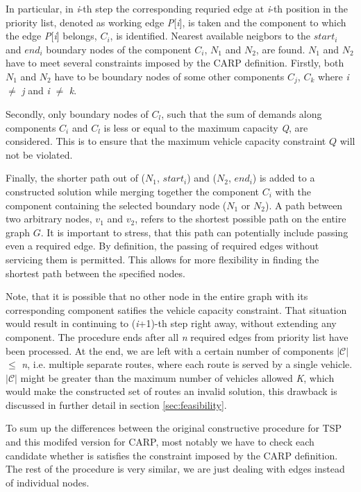 \documentclass[twoside]{ctuthesis}
\theoremstyle{plain}
\theoremstyle{definition}
\theoremstyle{note}
\begin{document}
In particular, in \emph{i}-th step the corresponding requried edge at \emph{i}-th position in the priority list, denoted as working edge \emph{P}[\emph{i}], is taken and the component to which the edge \emph{P}[\emph{i}] belongs, \emph{$C_i$}, is identified. Nearest available neigbors to the \emph{$start_i$} and \emph{$end_i$} boundary nodes of the component \emph{$C_i$}, \emph{$N_1$} and \emph{$N_2$}, are found. \emph{$N_1$} and \emph{$N_2$} have to meet several constraints imposed by the CARP definition. Firstly, both \emph{$N_1$} and \emph{$N_2$} have to be boundary nodes of some other components \emph{$C_j$}, \emph{$C_k$} where \emph{i} $\neq$ \emph{j} and \emph{i} $\neq$ \emph{k}. 

Secondly, only boundary nodes of \emph{$C_l$}, such that the sum of demands along components \emph{$C_i$} and \emph{$C_l$} is less or equal to the maximum capacity \emph{Q}, are considered. This is to ensure that the maximum vehicle capacity constraint $Q$ will not be violated.

Finally, the shorter path out of (\emph{$N_1$}, \emph{$start_i$}) and (\emph{$N_2$}, \emph{$end_i$}) is added to a constructed solution while merging together the component \emph{$C_i$} with the component containing the selected boundary node (\emph{$N_1$} or \emph{$N_2$}).
A path between two arbitrary nodes, $v_1$ and $v_2$, refers to the shortest possible path on the entire graph $G$. It is important to stress, that this path can potentially include passing even a required edge. By definition, the passing of required edges without servicing them is permitted. This allows for more flexibility in finding the shortest path between the specified nodes.

Note, that it is possible that no other node in the entire graph with its corresponding component satifies the vehicle capacity constraint. That situation would result in continuing to (\emph{i}+1)-th step right away, without extending any component. The procedure ends after all \emph{n} required edges from priority list have been processed. At the end, we are left with a certain number of components \emph{$\mathcal{|C|}$} $\leq$ \emph{n}, i.e. multiple separate routes, where each route is served by a single vehicle. \emph{$\mathcal{|C|}$} might be greater than the maximum number of vehicles allowed \emph{K}, which would make the constructed set of routes an invalid solution, this drawback is discussed in further detail in section \ref{sec:feasibility}.

To sum up the differences between the original constructive procedure for TSP and this modifed version for CARP, most notably we have to check each candidate whether is satisfies the constraint imposed by the CARP definition. The rest of the procedure is very similar, we are just dealing with edges instead of individual nodes.
\end{document}
